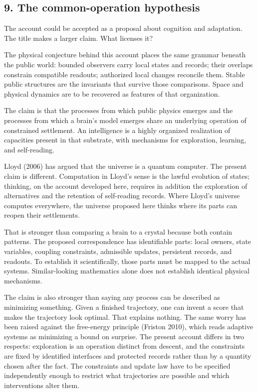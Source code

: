 \documentclass[
  11pt,
]{article}
\begin{document}
\subsection{9. The common-operation
hypothesis}\label{the-common-operation-hypothesis}

The account could be accepted as a proposal about cognition and
adaptation. The title makes a larger claim. What licenses it?

The physical conjecture behind this account places the same grammar
beneath the public world: bounded observers carry local states and
records; their overlaps constrain compatible readouts; authorized local
changes reconcile them. Stable public structures are the invariants that
survive those comparisons. Space and physical dynamics are to be
recovered as features of that organization.

The claim is that the processes from which public physics emerges and
the processes from which a brain's model emerges share an underlying
operation of constrained settlement. An intelligence is a highly
organized realization of capacities present in that substrate, with
mechanisms for exploration, learning, and self-reading.

Lloyd (2006) has argued that the universe is a quantum computer. The
present claim is different. Computation in Lloyd's sense is the lawful
evolution of states; thinking, on the account developed here, requires
in addition the exploration of alternatives and the retention of
self-reading records. Where Lloyd's universe computes everywhere, the
universe proposed here thinks where its parts can reopen their
settlements.

That is stronger than comparing a brain to a crystal because both
contain patterns. The proposed correspondence has identifiable parts:
local owners, state variables, coupling constraints, admissible updates,
persistent records, and readouts. To establish it scientifically, those
parts must be mapped to the actual systems. Similar-looking mathematics
alone does not establish identical physical mechanisms.

The claim is also stronger than saying any process can be described as
minimizing something. Given a finished trajectory, one can invent a
score that makes the trajectory look optimal. That explains nothing. The
same worry has been raised against the free-energy principle (Friston
2010), which reads adaptive systems as minimizing a bound on surprise.
The present account differs in two respects: exploration is an operation
distinct from descent, and the constraints are fixed by identified
interfaces and protected records rather than by a quantity chosen after
the fact. The constraints and update law have to be specified
independently enough to restrict what trajectories are possible and
which interventions alter them.
\end{document}
